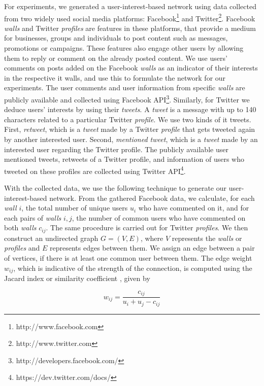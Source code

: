 For experiments, we generated a user-interest-based network using data collected from two widely used social media platforms: Facebook\footnote[1]{http://www.facebook.com}  and Twitter\footnote[2]{http://www.twitter.com}. Facebook {\it walls} and Twitter {\it profiles} are features in these platforms, that provide a medium for businesses, groups and individuals to post content such as messages, promotions or campaigns. These features also engage other users by allowing them to reply or comment on the already posted content. We use users' comments on posts added on the Facebook {\it walls} as an indicator of their interests in the respective {it walls}, and use this to formulate the network for our experiments. The user comments and user information from specific {\it walls} are publicly available and collected using Facebook API\footnote[3]{http://developers.facebook.com/}. Similarly, for Twitter we deduce users' interests by using their {\it tweets}. A {\it tweet} is a message with up to 140 characters related to a particular Twitter {\it profile}. We use two kinds of {it tweets}. First, {\it retweet}, which is a {\it tweet} made by a Twitter {\it profile} that gets tweeted again by another interested user. Second, {\it mentioned tweet}, which is a {\it tweet} made by an interested user regarding the Twitter profile. The publicly available user mentioned tweets, retweets of a Twitter profile, and information of users who tweeted on these profiles are collected using Twitter API\footnote[4]{https://dev.twitter.com/docs/}.

With the collected data, we use the following technique to generate our user-interest-based network. From the gathered Facebook data, we calculate, for each {\it wall} $i$, the total number of unique users $u_i$ who have commented on it, and for each pairs of {\it walls} $i, j$, the number of common users who have commented on both {\it walls} $c_{ij}$. The same procedure is carried out for Twitter {\it profiles}. We then construct an undirected graph $G = (V,E)$, where $V$ represents the {\it walls} or {\it profiles} and $E$ represents edges between them. We assign an edge between a pair of vertices, if there is at least one common user between them. The edge weight $w_{ij}$, which is indicative of the strength of the connection, is computed using the Jacard index or similarity coefficient \cite{Leydesdorff}, given by

\begin{equation}
w_{ij} = \frac{c_{ij}}{u_i+u_j-c_{ij}}
\end{equation}

